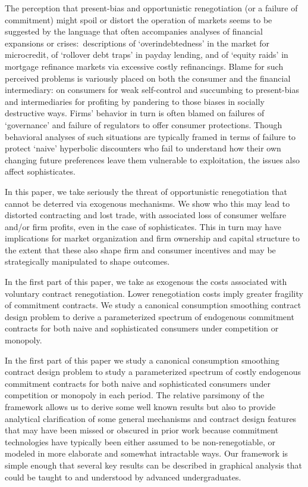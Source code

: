 \documentclass[11pt,english]{article}
\theoremstyle{plain}
\theoremstyle{definition}
\begin{document}
The perception that  present-bias and opportunistic renegotiation (or a failure of commitment) might  spoil or distort the operation of markets seems to be suggested by the language that often accompanies analyses of financial expansions or crises:\ descriptions of `overindebtedness' in the market for microcredit, of `rollover debt traps' in payday lending, and of `equity raids' in mortgage refinance markets via excessive costly refinancings. Blame for such perceived problems is variously placed on both the consumer and  the financial intermediary: on consumers for weak self-control and succumbing to present-bias
and intermediaries for profiting by pandering to those biases in socially destructive ways. Firms' behavior in turn is often blamed on failures of `governance' and  failure of regulators to offer consumer protections. Though behavioral analyses of such situations are typically framed in terms of failure to protect `naive' hyperbolic discounters   who fail to understand how their own changing future preferences  leave them vulnerable to  exploitation, the issues also affect sophisticates. 

In this paper, we take seriously the threat of opportunistic renegotiation that cannot be deterred via exogenous mechanisms. We show who this may lead to distorted contracting and lost trade, with associated loss of consumer welfare and/or firm profits, even in the case of sophisticates. This in turn may have  implications for market organization and firm ownership and capital structure to the extent that these also shape firm and consumer incentives and may be strategically manipulated to shape outcomes.

In the first part of this paper, we take as exogenous the costs associated with voluntary contract renegotiation. Lower renegotiation costs imply greater fragility of commitment contracts. We study a canonical consumption smoothing contract design problem to derive a parameterized spectrum of endogenous commitment contracts for both naive and sophisticated consumers under competition or monopoly.

In the first part of this paper we study a canonical consumption smoothing contract design problem to study a parameterized spectrum of costly endogenous commitment contracts for both naive and sophisticated consumers under competition or monopoly in each period.
The relative parsimony of the framework allows us to derive some well known results but also to provide analytical clarification of some general mechanisms and contract design features that may have  been missed or obscured in prior work
because commitment technologies have typically been either assumed to be non-renegotiable, or modeled in more elaborate and somewhat intractable ways. Our framework  is simple enough that several key results can be described in graphical analysis that could be taught to and understood by advanced undergraduates.
\end{document}
